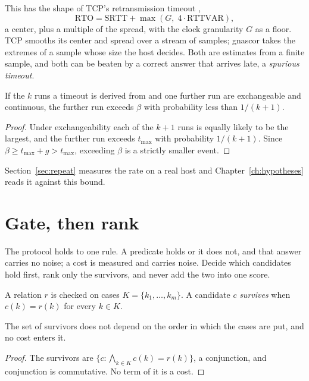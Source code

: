 This has the shape of TCP's retransmission timeout \cite{src:RFC6298},
\[
  \mathrm{RTO} = \mathrm{SRTT} + \max(G,\; 4 \cdot \mathrm{RTTVAR}),
\]
a center, plus a multiple of the spread, with the clock granularity \(G\) as a floor. TCP smooths
its center and spread over a stream of samples; gnascor takes the extremes of a sample whose size
the host decides. Both are estimates from a finite sample, and both can be beaten by a correct
answer that arrives late, a \emph{spurious timeout}.

\begin{proposition}
\label{prop:spurious}
If the \(k\) runs a timeout is derived from and one further run are exchangeable and continuous,
the further run exceeds \(\beta\) with probability less than \(1/(k+1)\).
\end{proposition}

\begin{proof}
Under exchangeability each of the \(k+1\) runs is equally likely to be the largest, and the
further run exceeds \(t_{\max}\) with probability \(1/(k+1)\). Since
\(\beta \ge t_{\max} + g > t_{\max}\), exceeding \(\beta\) is a strictly smaller event.
\end{proof}

Section~\ref{sec:repeat} measures the rate on a real host and Chapter~\ref{ch:hypotheses} reads
it against this bound.

\section{Gate, then rank}

The protocol holds to one rule. A predicate holds or it does not, and that answer carries no
noise; a cost is measured and carries noise. Decide which candidates hold first, rank only the
survivors, and never add the two into one score.

\begin{definition}[Gate]
A relation \(r\) is checked on cases \(K = \{k_1, \ldots, k_m\}\). A candidate \(c\) \emph{survives}
when \(c(k) = r(k)\) for every \(k \in K\).
\end{definition}

\begin{proposition}
\label{prop:gate}
The set of survivors does not depend on the order in which the cases are put, and no cost enters
it.
\end{proposition}

\begin{proof}
The survivors are \(\{c : \bigwedge_{k \in K} c(k) = r(k)\}\), a conjunction, and conjunction is
commutative. No term of it is a cost.
\end{proof}

